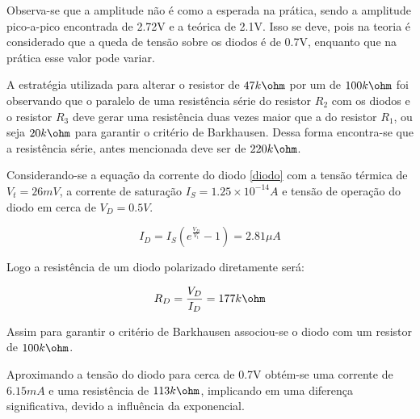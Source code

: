 Observa-se que a amplitude não é como a esperada na prática, sendo a amplitude pico-a-pico encontrada de 2.72V e a teórica de 2.1V. Isso se deve, pois na teoria é considerado que a queda de tensão sobre os diodos é de 0.7V, enquanto que na prática esse valor pode variar. 

A estratégia utilizada para alterar o resistor de $47k\ohm$ por um de $100k\ohm$ foi observando que o paralelo de uma resistência série do resistor $R_2$ com os diodos e o resistor $R_3$ deve gerar uma resistência duas vezes maior que a do resistor $R_1$, ou seja $20k\ohm$ para garantir o critério de Barkhausen. Dessa forma encontra-se que a resistência série, antes mencionada deve ser de $220k\ohm$. 

Considerando-se a equação da corrente do diodo \ref{diodo} com a tensão térmica de $V_t = 26mV$, a corrente de saturação $I_S = 1.25 \times 10^{-14}A$ e tensão de operação do diodo em cerca de $V_D = 0.5V$.

\begin{equation} \label{diodo}
I_D = I_S(e^{\frac{V_D}{V_t}}-1) = 2.81 \mu A
\end{equation}

Logo a resistência de um diodo polarizado diretamente será:

\begin{equation} \label{diodo}
R_D = \frac{V_D}{I_D} = 177k\ohm
\end{equation}

Assim para garantir o critério de Barkhausen associou-se o diodo com um resistor de $100k\ohm$.

Aproximando a tensão do diodo para cerca de 0.7V obtém-se uma corrente de $6.15mA$ e uma resistência de $113k\ohm$, implicando em uma diferença significativa, devido a influência da exponencial.
